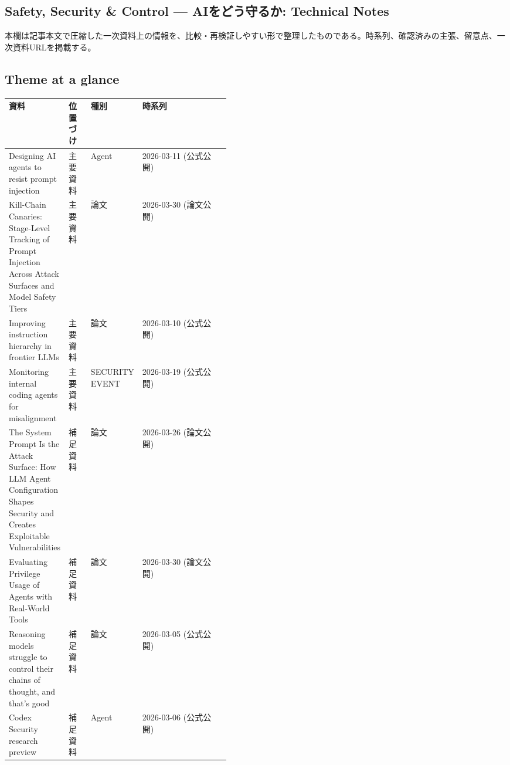 \subsection*{Safety, Security \& Control — AIをどう守るか: Technical Notes}
本欄は記事本文で圧縮した一次資料上の情報を、比較・再検証しやすい形で整理したものである。時系列、確認済みの主張、留意点、一次資料URLを掲載する。
\medskip
\subsection*{Theme at a glance}
\begin{center}
\footnotesize
\begin{tabularx}{\linewidth}{@{}p{0.20\linewidth}p{0.10\linewidth}p{0.14\linewidth}X@{}}
\toprule
資料 & 位置づけ & 種別 & 時系列 \\
\midrule
Designing AI agents to resist prompt injection & 主要資料 & Agent & 2026-03-11 (公式公開) \\
Kill-Chain Canaries: Stage-Level Tracking of Prompt Injection Across Attack Surfaces and Model Safety Tiers & 主要資料 & 論文 & 2026-03-30 (論文公開) \\
Improving instruction hierarchy in frontier LLMs & 主要資料 & 論文 & 2026-03-10 (公式公開) \\
Monitoring internal coding agents for misalignment & 主要資料 & SECURITY EVENT & 2026-03-19 (公式公開) \\
The System Prompt Is the Attack Surface: How LLM Agent Configuration Shapes Security and Creates Exploitable Vulnerabilities & 補足資料 & 論文 & 2026-03-26 (論文公開) \\
Evaluating Privilege Usage of Agents with Real-World Tools & 補足資料 & 論文 & 2026-03-30 (論文公開) \\
Reasoning models struggle to control their chains of thought, and that’s good & 補足資料 & 論文 & 2026-03-05 (公式公開) \\
Codex Security research preview & 補足資料 & Agent & 2026-03-06 (公式公開) \\
\bottomrule
\end{tabularx}
\end{center}
\normalsize

